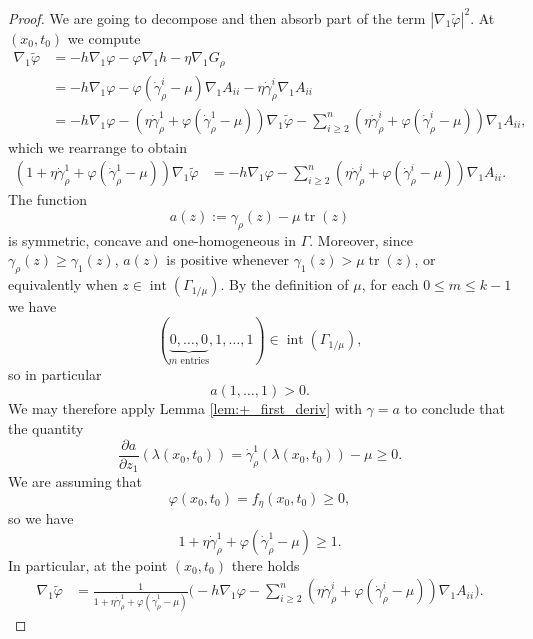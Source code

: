 \documentclass[12pt]{amsart}
\DeclareMathOperator{\interior}{int}
\DeclareMathOperator{\tr}{tr}
\begin{document}
\begin{proof}
We are going to decompose and then absorb part of the term $|\nabla_1 \tilde \varphi|^2$. At $(x_0,t_0)$ we compute
\begin{align*}
\nabla_1 \tilde \varphi &= -h \nabla_1 \varphi -\varphi \nabla_1 h - \eta \nabla_1 G_\rho\\
		&= - h \nabla_1 \varphi-\varphi (\dot \gamma^i_\rho - \mu)\nabla_1 A_{ii} - \eta \dot \gamma^i_\rho \nabla_1 A_{ii}\\
		&=-h \nabla_1 \varphi - (\eta \dot \gamma^1_\rho + \varphi(\dot \gamma^1_\rho - \mu)) \nabla_1 \tilde \varphi- \sum_{i \geq 2}^n (\eta \dot \gamma^i_\rho + \varphi(\dot \gamma^i_\rho - \mu))\nabla_1 A_{ii},
\end{align*} 
which we rearrange to obtain
\begin{align*}
(1 + \eta\dot \gamma_\rho^1 + \varphi(\dot \gamma_\rho^1 - \mu))\nabla_1 \tilde \varphi &=-h \nabla_1 \varphi - \sum_{i \geq 2}^n (\eta \dot \gamma_\rho^i + \varphi(\dot \gamma_\rho^i - \mu))\nabla_1 A_{ii}.
\end{align*}
 The function 
\[a(z):=  \gamma_\rho(z) - \mu \tr(z)\]
is symmetric, concave and one-homogeneous in $\Gamma$. Moreover, since $\gamma_\rho(z) \geq \gamma_1(z)$, $a(z)$ is positive whenever $\gamma_1(z) > \mu\tr(z)$, or equivalently when $z \in \interior (\Gamma_{1/\mu})$. By the definition of $\mu$, for each $0 \leq m \leq k-1$ we have 
\[(\underbrace{0,\dots,0}_{m \text{ entries}}, 1, \dots, 1) \in \interior (\Gamma_{1/\mu}),\]
so in particular 
\[a(1,\dots,1) >0.\]
We may therefore apply Lemma \ref{lem:+_first_deriv} with $\gamma = a$ to conclude that the quantity 
\[\frac{\partial a}{\partial z_1} (\lambda(x_0,t_0)) = \dot \gamma_\rho^1(\lambda(x_0,t_0)) - \mu \geq 0.\] 
We are assuming that
\[\varphi(x_0,t_0) = f_\eta(x_0,t_0) \geq 0,\]
so we have 
\[1 + \eta\dot \gamma_\rho^1 + \varphi(\dot \gamma_\rho^1 - \mu) \geq 1.\]
In particular, at the point $(x_0, t_0)$ there holds
\begin{align*}
\nabla_1 \tilde \varphi &= \frac{1}{1 + \eta\dot \gamma_\rho^1 + \varphi(\dot \gamma_\rho^1 - \mu)} \bigg(-h \nabla_1 \varphi - \sum_{i \geq 2}^n (\eta \dot \gamma_\rho^i + \varphi(\dot \gamma_\rho^i - \mu))\nabla_1 A_{ii}\bigg).
\end{align*}


\end{proof}
\end{document}

